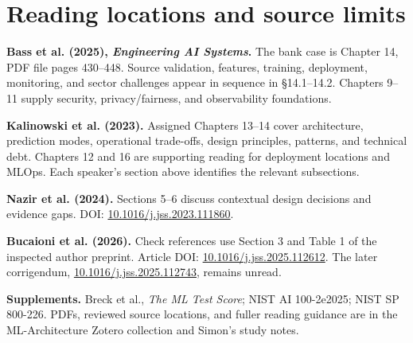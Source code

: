 \documentclass[12pt,a4paper]{article}
\begin{document}
\section{Reading locations and source limits}
\textbf{Bass et al. (2025), \emph{Engineering AI Systems}.} The bank case is Chapter 14, PDF file pages 430--448. Source validation, features, training, deployment, monitoring, and sector challenges appear in sequence in \S14.1--14.2. Chapters 9--11 supply security, privacy/fairness, and observability foundations.

\textbf{Kalinowski et al. (2023).} Assigned Chapters 13--14 cover architecture, prediction modes, operational trade-offs, design principles, patterns, and technical debt. Chapters 12 and 16 are supporting reading for deployment locations and MLOps. Each speaker's section above identifies the relevant subsections.

\textbf{Nazir et al. (2024).} Sections 5--6 discuss contextual design decisions and evidence gaps. DOI: \href{https://doi.org/10.1016/j.jss.2023.111860}{10.1016/j.jss.2023.111860}.

\textbf{Bucaioni et al. (2026).} Check references use Section 3 and Table 1 of the inspected author preprint. Article DOI: \href{https://doi.org/10.1016/j.jss.2025.112612}{10.1016/j.jss.2025.112612}. The later corrigendum, \href{https://doi.org/10.1016/j.jss.2025.112743}{10.1016/j.jss.2025.112743}, remains unread.

\textbf{Supplements.} Breck et al., \emph{The ML Test Score}; NIST AI 100-2e2025; NIST SP 800-226. PDFs, reviewed source locations, and fuller reading guidance are in the ML-Architecture Zotero collection and Simon's study notes.
\end{document}
